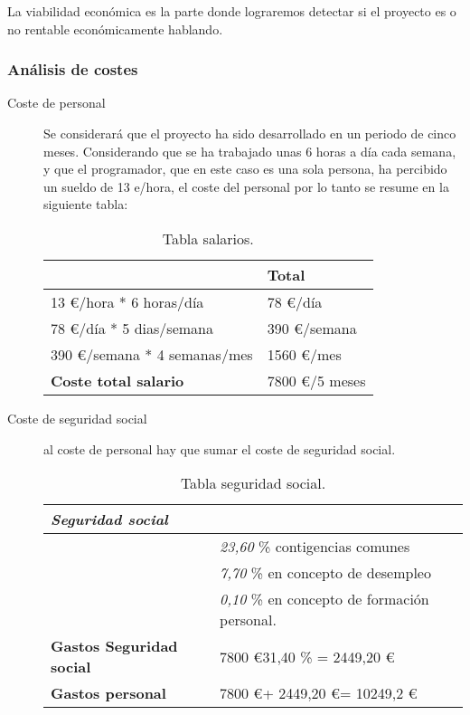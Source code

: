La viabilidad económica es la parte donde lograremos detectar si el proyecto es o no rentable económicamente hablando.

\subsubsection{Análisis de costes}\label{costes}

\begin{description}
	\item[Coste de personal] Se considerará que el proyecto ha sido desarrollado en un periodo de cinco meses.  Considerando que se ha trabajado unas 6 horas a día cada semana, y que el programador, que en este caso es una sola persona, ha percibido un sueldo de 13 e/hora, el coste del personal por lo tanto se resume en la siguiente tabla:
	
\begin{table}[htbp]
\begin{center}
\begin{tabular}{|l|l|}
\hline
 & Total \\
\hline \hline
13 \euro /hora * 6 horas/día &   78 \euro /día \\ \hline
78 \euro /día * 5 dias/semana &   390 \euro /semana \\ \hline
390 \euro /semana * 4 semanas/mes &   1560 \euro /mes \\ \hline
\textbf{Coste total salario} &   7800 \euro /5 meses \\ \hline
\end{tabular}
\caption{Tabla salarios.}
\label{tabla:salarios}
\end{center}
\end{table}
	
	\item[Coste de seguridad social] al coste de personal hay que sumar el coste de seguridad social. 
	
	
	\begin{table}[htbp]
\begin{center}
\begin{tabular}{|l|l|}
\hline
 \emph{Seguridad social} &  \\
\hline \hline
 & \emph{23,60} \% contigencias comunes \\ \hline
&   \emph{7,70} \% en concepto de desempleo \\ \hline
 &   \emph{0,10} \% en concepto de formación personal. \\ \hline
\textbf{Gastos Seguridad social}  &   7800 \euro * 31,40 \% =  2449,20 \euro \\ \hline
\textbf{Gastos personal}  &  7800 \euro + 2449,20 \euro = 10249,2 \euro  \\ \hline
\end{tabular}
\caption{Tabla seguridad social.}
\label{tabla:ssocial}
\end{center}
\end{table}
	

\end{description}
